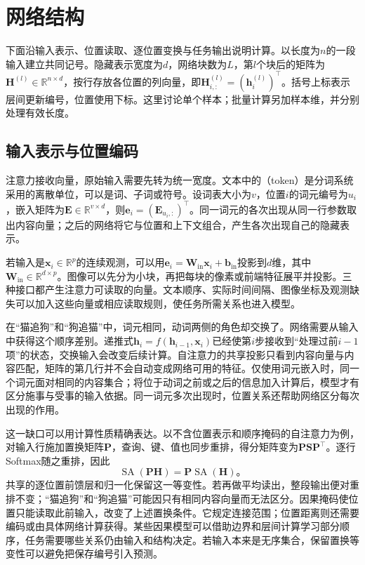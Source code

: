 \section{网络结构}
\label{sec:transformer-structure}

下面沿输入表示、位置读取、逐位置变换与任务输出说明计算。以长度为$n$的一段输入建立共同记号。隐藏表示宽度为$d$，网络块数为$L$，第$l$个块后的矩阵为$\bm H^{(l)}\in\mathbb R^{n\times d}$，按行存放各位置的列向量，即$\bm H_{i,:}^{(l)}=(\bm h_i^{(l)})^{\top}$。括号上标表示层间更新编号，位置使用下标。这里讨论单个样本；批量计算另加样本维，并分别处理有效长度。

\subsection{输入表示与位置编码}
\label{sec:transformer-input}

注意力接收向量，原始输入需要先转为统一宽度。文本中的（token）是分词系统采用的离散单位，可以是词、子词或符号。设词表大小为$v$，位置$i$的词元编号为$u_i$，嵌入矩阵为$\bm E\in\mathbb R^{v\times d}$，则$\bm e_i=(\bm E_{u_i,:})^{\top}$。同一词元的各次出现从同一行参数取出内容向量；之后的网络将它与位置和上下文组合，产生各次出现自己的隐藏表示。

若输入是$\bm x_i\in\mathbb R^p$的连续观测，可以用$\bm e_i=\bm W_{\mathrm{in}}\bm x_i+\bm b_{\mathrm{in}}$投影到$d$维，其中$\bm W_{\mathrm{in}}\in\mathbb R^{d\times p}$。图像可以先分为小块，再把每块的像素或前端特征展平并投影。三种接口都产生注意力可读取的向量。文本顺序、实际时间间隔、图像坐标及观测缺失可以加入这些向量或相应读取规则，使任务所需关系也进入模型。

在“猫追狗”和“狗追猫”中，词元相同，动词两侧的角色却交换了。网络需要从输入中获得这个顺序差别。递推式$\bm h_i=f(\bm h_{i-1},\bm x_i)$已经使第$i$步接收到“处理过前$i-1$项”的状态，交换输入会改变后续计算。自注意力的共享投影只看到内容向量与内容匹配，矩阵的第几行并不会自动变成网络可用的特征。仅使用词元嵌入时，同一个词元面对相同的内容集合；将位于动词之前或之后的信息加入计算后，模型才有区分施事与受事的输入依据。同一词元多次出现时，位置关系还帮助网络区分每次出现的作用。

这一缺口可以用计算性质精确表达。以不含位置表示和顺序掩码的自注意力为例，对输入行施加置换矩阵$\bm P$，查询、键、值也同步重排，得分矩阵变为$\bm P\bm S\bm P^{\top}$。逐行Softmax随之重排，因此
\begin{equation}
  \operatorname{SA}(\bm P\bm H)
  =\bm P\operatorname{SA}(\bm H)\text{。}
  \label{eq:transformer-permutation}
\end{equation}
共享的逐位置前馈层和归一化保留这一等变性。若再做平均读出，整段输出便对重排不变；“猫追狗”和“狗追猫”可能因只有相同内容向量而无法区分。因果掩码使位置只能读取此前输入，改变了上述置换条件。它规定连接范围；位置距离则还需要编码或由具体网络计算获得。某些因果模型可以借助边界和层间计算学习部分顺序，任务需要哪些关系仍由输入和结构决定。若输入本来是无序集合，保留置换等变性可以避免把保存编号引入预测。

